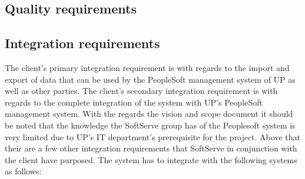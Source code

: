 \documentclass[12pt]{article}
\begin{document}
\subsection{Quality requirements} %
\vspace{0.2in}



\vspace{0.1in}
\newpage
\subsection{Integration requirements} %
\vspace{0.2in}
The client's primary integration requirement is with regards to the import and export of data that can be used by the PeopleSoft management system of UP as well as other parties. The client's secondary integration requirement is with regards to the complete integration of the system with UP's PeopleSoft management system. With the regards the vision and scope document it should be noted that the knowledge the SoftServe group has of the Peoplesoft system is very limited due to UP's IT department's prerequisite for the project. Above that their are a few other integration requirements that SoftServe in conjunction with the client have purposed. The system has to integrate with the following systems as follows:
\end{document}
